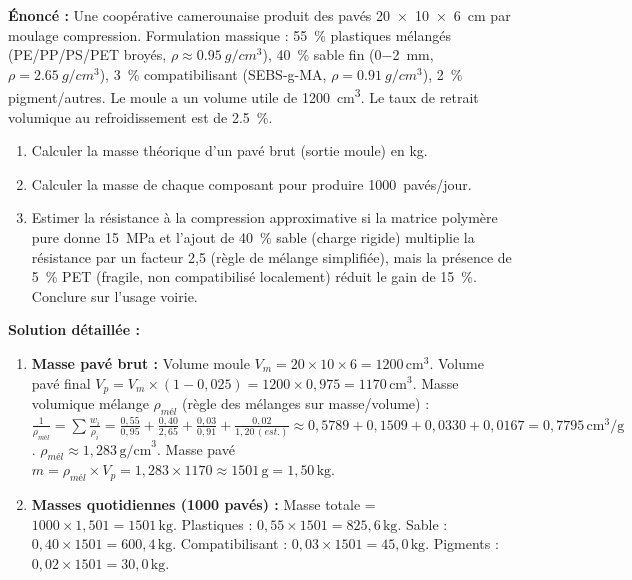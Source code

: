 \documentclass[11pt]{article}
\begin{document}
\begin{exoresolu}
\textbf{Énoncé :} Une coopérative camerounaise produit des pavés \SI{20 x 10 x 6}{cm} par moulage compression. Formulation massique : \SI{55}{\%} plastiques mélangés (PE/PP/PS/PET broyés, $\rho \approx \SI{0,95}{g/cm^3}$), \SI{40}{\%} sable fin (\SI{0-2}{mm}, $\rho = \SI{2,65}{g/cm^3}$), \SI{3}{\%} compatibilisant (SEBS-g-MA, $\rho = \SI{0,91}{g/cm^3}$), \SI{2}{\%} pigment/autres. Le moule a un volume utile de \SI{1200}{cm^3}. Le taux de retrait volumique au refroidissement est de \SI{2,5}{\%}.
\begin{enumerate}
    \item Calculer la masse théorique d'un pavé brut (sortie moule) en kg.
    \item Calculer la masse de chaque composant pour produire \SI{1000}{pavés/jour}.
    \item Estimer la résistance à la compression approximative si la matrice polymère pure donne \SI{15}{MPa} et l'ajout de \SI{40}{\%} sable (charge rigide) multiplie la résistance par un facteur 2,5 (règle de mélange simplifiée), mais la présence de \SI{5}{\%} PET (fragile, non compatibilisé localement) réduit le gain de \SI{15}{\%}. Conclure sur l'usage voirie.
\end{enumerate}
\tcblower
\textbf{Solution détaillée :}
\begin{enumerate}
    \item \textbf{Masse pavé brut :}
    Volume moule $V_m = 20 \times 10 \times 6 = 1200\,\text{cm}^3$.
    Volume pavé final $V_p = V_m \times (1 - 0,025) = 1200 \times 0,975 = 1170\,\text{cm}^3$.
    Masse volumique mélange $\rho_{mél}$ (règle des mélanges sur masse/volume) :
    $\frac{1}{\rho_{mél}} = \sum \frac{w_i}{\rho_i} = \frac{0,55}{0,95} + \frac{0,40}{2,65} + \frac{0,03}{0,91} + \frac{0,02}{1,20\,(est.)} \approx 0,5789 + 0,1509 + 0,0330 + 0,0167 = 0,7795\,\text{cm}^3/\text{g}$.
    $\rho_{mél} \approx 1,283\,\text{g/cm}^3$.
    Masse pavé $m = \rho_{mél} \times V_p = 1,283 \times 1170 \approx 1501\,\text{g} = \boxed{1,50\,\text{kg}}$.
    
    \item \textbf{Masses quotidiennes (1000 pavés) :}
    Masse totale = $1000 \times 1,501 = 1501\,\text{kg}$.
    Plastiques : $0,55 \times 1501 = \boxed{825,6\,\text{kg}}$.
    Sable : $0,40 \times 1501 = \boxed{600,4\,\text{kg}}$.
    Compatibilisant : $0,03 \times 1501 = \boxed{45,0\,\text{kg}}$.
    Pigments : $0,02 \times 1501 = \boxed{30,0\,\text{kg}}$.
    

\end{enumerate}
\end{exoresolu}
\end{document}
